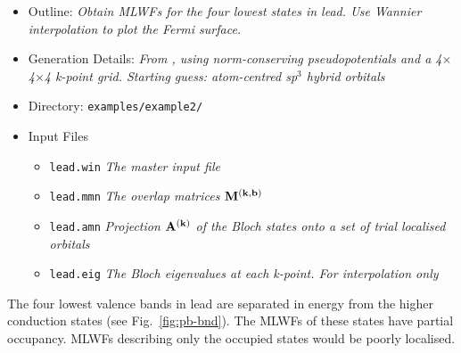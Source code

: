 \documentclass[a4paper,11pt,twoside]{article}
\begin{document}




\begin{itemize}
\item{Outline: \it{Obtain MLWFs for the four lowest states
    in lead. Use Wannier interpolation to plot the Fermi surface.}}
\item{Generation Details: \it{From \pwscf, using norm-conserving
    pseudopotentials and a 4$\times$4$\times$4 k-point grid. Starting
    guess: atom-centred sp$^3$ hybrid orbitals}} 
\item{Directory: {\tt examples/example2/}}
\item{Input Files}
\begin{itemize}
\item{ {\tt lead.win}  {\it The master input file}}
\item{ {\tt lead.mmn}  {\it The overlap matrices $\mathbf{M}^{(\mathbf{k},\mathbf{b})}$}}
\item{ {\tt lead.amn}  {\it Projection $\mathbf{A}^{(\mathbf{k})}$ of the Bloch states onto a set
    of trial localised orbitals}} 
\item{ {\tt lead.eig}  {\it The Bloch eigenvalues at each k-point. For
    interpolation only}} 
\end{itemize}

\end{itemize}

The four lowest valence bands in lead are separated in energy from the
higher conduction states (see Fig.~\ref{fig:pb-bnd}). The MLWFs of
these states have partial occupancy. MLWFs describing only the occupied
states would be poorly localised.
\end{document}

